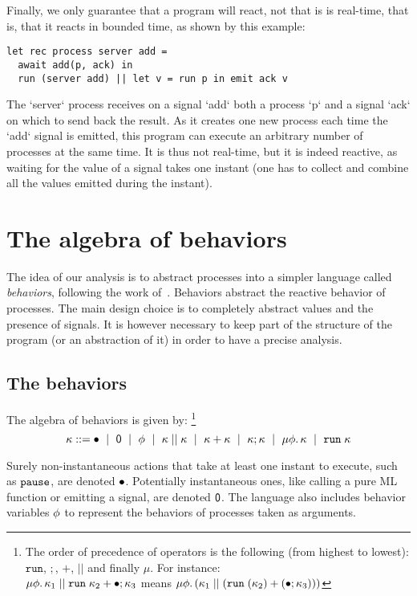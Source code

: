 \documentclass[9pt,preprint]{sigplanconf}
\newcommand{\sdeq}{::=}
\begin{document}
Finally, we only guarantee that a program will react, not that is is real-time, that is, that it reacts in bounded time, as shown by this example:
\begin{lstlisting}
let rec process server add =
  await add(p, ack) in
  run (server add) || let v = run p in emit ack v
\end{lstlisting}
%
The `server` process receives on a signal `add` both a process `p` and a signal `ack` on which to send back the result. As it creates one new process each time the `add` signal is emitted, this program can execute an arbitrary number of processes at the same time. It is thus not real-time, but it is indeed reactive, as waiting for the value of a signal takes one instant (one has to collect and combine all the values emitted during the instant).

\section{The algebra of behaviors}
\label{sec:behaviors}



The idea of our analysis is to abstract processes into a simpler language called \emph{behaviors}, following the work of~\cite{Amtoft:1999}. Behaviors abstract the reactive behavior of processes. The main design choice is to completely abstract values and the presence of signals. It is however necessary to keep part of the structure of the program (or an abstraction of it) in order to have a precise analysis.

\subsection{The behaviors}

The algebra of behaviors is given by:
\footnote{The order of precedence of operators is the following (from highest to lowest): $\mathtt{run}$, $;$, $+$, $||$ and finally $\mu$. For instance: \\
$ \mu \phi.\, \kappa_1 \mid\mid \mathtt{run}\; \kappa_2 + \bullet ; \kappa_3 $
means
$ \mu \phi.\, (\kappa_1 \mid\mid (\mathtt{run}\; (\kappa_2) + (\bullet ; \kappa_3))) $
}
%
\[
\rk \sdeq \effplus ~\mid~ \effmin ~\mid~ \effvar ~\mid~ \effpar{\rk}{\rk} ~\mid~ \effor{\rk}{\rk}
~\mid~ \effcon{\rk}{\rk}  ~\mid~ \effrec{\effvar}{\rk}  ~\mid~ \effrun{\rk}
\]

Surely non-instantaneous actions that take at least one instant to execute, such as $\mathtt{pause}$, are denoted $\bullet$. Potentially instantaneous ones, like calling a pure ML function or emitting a signal, are denoted $\textsf{0}$. The language also includes behavior variables $\phi$ to represent the behaviors of processes taken as arguments. 
\end{document}
